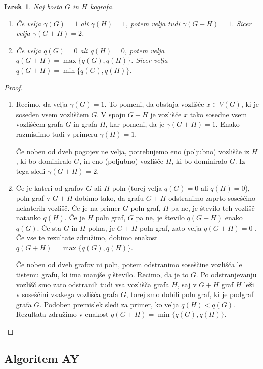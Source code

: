 \documentclass[12pt,a4paper,twoside]{article}
\theoremstyle{definition} %
\theoremstyle{plain} %
\newtheorem{izrek}[definicija]{Izrek}
\numberwithin{equation}{section}  %
\begin{document}
\begin{izrek} \label{theorem4.6}
Naj bosta $G$ in $H$ kografa.
\begin{enumerate}[label=(\roman*)]
\item Če velja $\gamma(G) = 1$ ali $\gamma(H) = 1$, potem velja tudi $\gamma(G + H) = 1$. Sicer velja $\gamma(G + H) = 2$.
\item Če velja $q(G) = 0$ ali $q(H) = 0$, potem velja $q(G + H) = \max\{q(G), q(H)\}$. Sicer velja $q(G + H) = \min\{q(G), q(H)\}$.
\end{enumerate}
\end{izrek}
\begin{proof}
\begin{enumerate}[label=($\roman*)$]
\item Recimo, da velja $\gamma(G) = 1$. To pomeni, da obstaja vozlišče $x \in V(G)$, ki je soseden vsem vozliščem $G$. V spoju $G + H$ je vozlišče $x$ tako sosedne vsem vozliščem grafa $G$ in grafa $H$, kar pomeni, da je $\gamma(G + H) = 1$. Enako razmislimo tudi v primeru $\gamma(H) = 1$.

Če noben od dveh pogojev ne velja, potrebujemo eno (poljubno) vozlišče iz $H$, ki bo dominiralo $G$, in eno (poljubno) vozlišče $H$, ki bo dominiralo $G$. Iz tega sledi $\gamma(G + H) = 2$.
\item Če je kateri od grafov $G$ ali $H$ poln (torej velja $q(G) = 0$ ali $q(H) = 0$), poln graf v $G + H$ dobimo tako, da grafu $G + H$ odstranimo zaprto soseščino nekaterih vozlišč. Če je na primer $G$ poln graf, $H$ pa ne, je število teh vozlišč natanko $q(H)$. Če je $H$ poln graf, $G$ pa ne, je število $q(G + H)$ enako $q(G)$. Če sta $G$ in $H$ polna, je $G + H$ poln graf, zato velja $q(G + H) = 0$ . Če vse te rezultate združimo, dobimo enakost $q(G + H) = \max\{q(G), q(H)\}$.

Če noben od dveh grafov ni poln, potem odstranimo soseščine vozlišča le tistemu grafu, ki ima manjše $q$ število. Recimo, da je to $G$. Po odstranjevanju vozlišč smo zato odstranili tudi vsa vozlišča grafa $H$, saj v $G + H$ graf $H$ leži v soseščini vsakega vozlišča grafa $G$, torej smo dobili poln graf, ki je podgraf grafa $G$. Podoben premislek sledi za primer, ko velja $q(H) < q(G)$. Rezultata združimo v enakost $q(G + H) = \min\{q(G), q(H)\}$.
\end{enumerate}
\end{proof}

\subsection{Algoritem AY}
\end{document}
